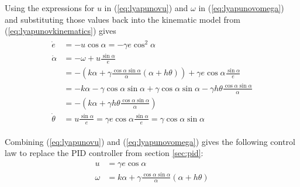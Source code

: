 Using the expressions for $u$ in (\ref{eq:lyapunovu}) and $\omega$ in (\ref{eq:lyapunovomega}) and substituting those values back into the kinematic model from (\ref{eq:lyapunovkinematics}) gives
\begin{align}
\label{eq:lyapunovfinalkinematics}
\begin{split}
\dot{e} &= -u\cos\alpha = -\gamma e\cos^2\alpha \\
\dot{\alpha} &= -\omega + u\frac{\sin\alpha}{e} \\
&= -(k\alpha+\gamma\frac{\cos\alpha\sin\alpha}{\alpha}(\alpha+h\theta))+\gamma e\cos\alpha\frac{\sin\alpha}{e} \\
&= -k\alpha-\gamma\cos\alpha\sin\alpha+\gamma\cos\alpha\sin\alpha-\gamma h\theta\frac{\cos\alpha\sin\alpha}{\alpha} \\
&= -\left(k\alpha + \gamma h\theta\frac{\cos\alpha\sin\alpha}{\alpha}\right) \\
\dot{\theta} &= u\frac{\sin\alpha}{e} = \gamma e\cos\alpha\frac{\sin\alpha}{e} = \gamma\cos\alpha\sin\alpha
\end{split}
\end{align}

Combining (\ref{eq:lyapunovu}) and (\ref{eq:lyapunovomega}) gives the following control law to replace the PID controller from section \ref{sec:pid}:
\begin{align}
\label{eq:lyapunovControlLaw}
\begin{split}
u &= \gamma e\cos\alpha \\
\omega &= k\alpha + \gamma\frac{\cos\alpha\sin\alpha}{\alpha}\left(\alpha+h\theta\right)
\end{split}
\end{align}

